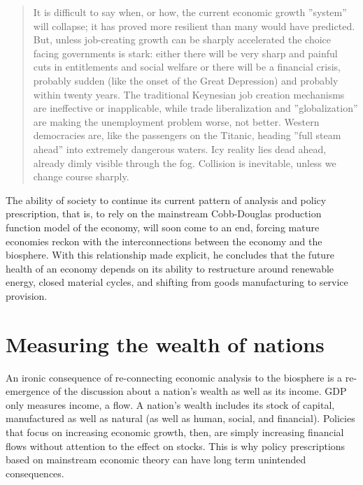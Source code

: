 \begin{quote}It is difficult to say when, or how, the current economic growth ''system'' will collapse;
it has proved more resilient than many would have predicted. But, unless job-creating growth
can be sharply accelerated the choice facing governments is stark: either there will be very
sharp and painful cuts in entitlements and social welfare or there will be a financial crisis,
probably sudden (like the onset of the Great Depression) and probably within twenty years.
The traditional Keynesian job creation mechanisms are ineffective or inapplicable, while trade
liberalization and ''globalization'' are making the unemployment problem worse, not better.
Western democracies are, like the passengers on the Titanic, heading ''full steam ahead'' into
extremely dangerous waters. Icy reality lies dead ahead, already dimly visible through the fog.
Collision is inevitable, unless we change course sharply.~\cite{ayres1997}
\end{quote}


The ability of society to continue its current pattern of analysis and policy prescription,
that is, to rely on the mainstream Cobb-Douglas production function model of the economy,
 will soon come to an end, forcing mature economies reckon with the interconnections between
the economy and the biosphere. With this relationship made explicit, he concludes that the future health of an economy depends on its ability to restructure around renewable energy, closed material cycles, and shifting from goods manufacturing to service provision.

\section{Measuring the wealth of nations}
\label{sec:wealth_nations}

An ironic consequence of re-connecting economic analysis to the biosphere is a 
re-emergence of the discussion about a nation's wealth as well as its income. GDP only measures income, a flow. A nation's wealth includes its stock of 
capital, manufactured as well as natural (as well as human, social, and financial). Policies that focus on
increasing economic growth, then, are simply increasing financial flows without
attention to the effect on stocks. This is why policy prescriptions based on
mainstream economic theory can have long term unintended consequences. 


